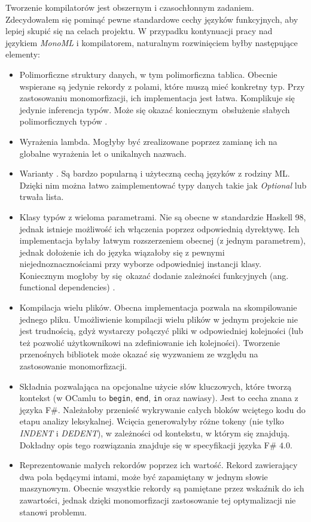 \documentclass[declaration,shortabstract]{iithesis}
\begin{document}
Tworzenie kompilatorów jest obszernym i czasochłonnym zadaniem. Zdecydowałem 
się pominąć pewne standardowe cechy języków funkcyjnych, aby lepiej skupić 
się na celach projektu. W przypadku kontynuacji pracy nad językiem \textit{MonoML}
i kompilatorem, naturalnym rozwinięciem byłby następujące elementy:

\begin{itemize}
  \item Polimorficzne struktury danych, w tym polimorficzna tablica. Obecnie 
  wspierane są jedynie rekordy z polami, które muszą mieć konkretny typ. 
  Przy zastosowaniu monomorfizacji, ich implementacja jest łatwa. Komplikuje
  się jedynie inferencja typów. Może się okazać koniecznym obsłużenie słabych 
  polimorficznych typów \cite{weak_poly_ocaml}.
  \item Wyrażenia lambda. Mogłyby być zrealizowane poprzez zamianę ich na 
  globalne wyrażenia let o unikalnych nazwach. 
  \item Warianty \cite[Chapter 6]{real_ocaml}. Są bardzo popularną i użyteczną cechą 
  języków z rodziny ML. Dzięki nim można łatwo zaimplementować typy danych takie 
  jak \textit{Optional} lub trwała lista.   
  \item Klasy typów z wieloma parametrami. Nie są obecne w standardzie 
  Haskell 98, jednak istnieje możliwość ich włączenia poprzez odpowiednią 
  dyrektywę. Ich implementacja byłaby łatwym 
  rozszerzeniem obecnej (z jednym parametrem), jednak dołożenie ich do języka 
  wiązałoby się z pewnymi niejednoznacznościami \cite{multi_params_tcs}
  przy wyborze odpowiedniej instancji klasy. Koniecznym mogłoby by się okazać 
  dodanie zależności funkcyjnych (ang. functional dependencies) \cite{fun_deps}.
  \item Kompilacja wielu plików. Obecna implementacja pozwala na skompilowanie 
  jednego pliku. Umożliwienie kompilacji wielu plików w jednym projekcie nie 
  jest trudnością, gdyż wystarczy połączyć pliki w odpowiedniej kolejności
  (lub też pozwolić użytkownikowi na zdefiniowanie ich kolejności). Tworzenie 
  przenośnych bibliotek może okazać się wyzwaniem ze względu na zastosowanie 
  monomorfizacji.
  \item Składnia pozwalająca na opcjonalne użycie słów kluczowych, które tworzą 
  kontekst (w OCamlu to \texttt{begin}, \texttt{end}, \texttt{in} oraz nawiasy).
  Jest to cecha znana z języka F\#. Należałoby przenieść wykrywanie 
  całych bloków wciętego kodu do etapu analizy leksykalnej. Wcięcia generowałyby 
  różne tokeny (nie tylko \textit{INDENT} i \textit{DEDENT}), w zależności 
  od kontekstu, w którym się znajdują. Dokładny opis tego rozwiązania znajduje 
  się w specyfikacji języka F\# $4.0$\cite{fs_spec}.
  \item Reprezentowanie małych rekordów poprzez ich wartość. Rekord zawierający 
  dwa pola będącymi intami, może być zapamiętany w jednym słowie maszynowym. 
  Obecnie wszystkie rekordy są pamiętane przez wskaźnik do ich zawartości, 
  jednak dzięki monomorfizacji zastosowanie tej optymalizacji nie stanowi 
  problemu.

\end{itemize}
\end{document}
